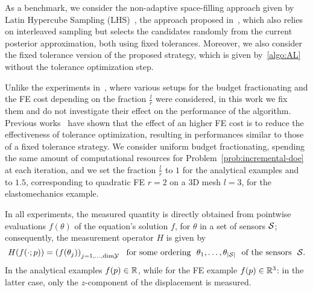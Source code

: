 As a benchmark, we consider the non-adaptive space-filling approach given by Latin Hypercube Sampling (LHS)~\cite{McKayBeckmanConover1979}, the approach proposed in~\cite{Dinkel2024}, which also relies on interleaved sampling but selects the candidates randomly from the current posterior approximation, both using fixed tolerances.
Moreover, we also consider the fixed tolerance version of the proposed strategy, which is given by~\ref{algo:AL} without the tolerance optimization step. \medskip

Unlike the experiments in~\cite{VillaniArconesUngerWeiser2025}, where various setups for the budget fractionating and the FE cost depending on the fraction $\frac{l}{r}$ were considered, in this work we fix them and do not investigate their effect on the performance of the algorithm.
Previous works~\cite{SemlerWeiser2023,VillaniArconesUngerWeiser2025,VillaniUngerWeiser2024} have shown that the effect of an higher FE cost is to reduce the effectiveness of tolerance optimization, resulting in performances similar to those of a fixed tolerance strategy.
We consider uniform budget fractionating, spending the same amount of computational resources for Problem~\eqref{prob:incremental-doe} at each iteration, and we set the fraction $\frac{l}{r}$ to $1$ for the analytical examples and to $1.5$, corresponding to quadratic FE $r=2$ on a 3D mesh $l=3$, for the elastomechanics example. \medskip

In all experiments, the measured quantity is directly obtained from pointwise evaluations $f(\theta)$ of the equation's solution $f$, for $\theta$ in a set of sensors $\mathcal S$; consequently, the measurement operator $H$ is given by
\[
    H(f(\cdot; p)) = \left( f(\theta_j)\right)_{j=1,\ldots, \text{dim} \mathcal Y} \ \text{ for some ordering } \ \theta_1, \ldots, \theta_{|\mathcal S|} \ \text{ of the sensors } \ \mathcal S.
\]
In the analytical examples $f(p) \in \mathbb{R}$, while for the FE example $f(p)\in \mathbb{R}^3$: in the latter case, only the $z$-component of the displacement is measured. \medskip

